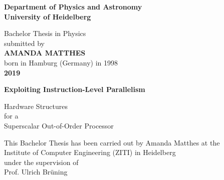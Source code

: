 \documentclass[12pt,a4paper]{article} %
\begin{document}
\thispagestyle{empty}
\begin{titlepage}
	\begin{center}
		
		\Large\textbf{Department of Physics and Astronomy\\
			University of Heidelberg}
		
		\vspace{17cm}
		
		\normalsize
		Bachelor Thesis in Physics\\
		submitted by\\
		\vspace{0.5cm}
		\Large\textbf{AMANDA MATTHES}\\
		\normalsize
		\vspace{0.5cm}
		born in Hamburg (Germany) in 1998\\
		\vspace{0.5cm}
		\Large\textbf{2019}
		\normalsize
		
		\newpage
		\thispagestyle{empty}
		
		
		
		
		{\fontsize{21}{30}\selectfont 
			\textbf{Exploiting Instruction-Level Parallelism}
			\par
		}
		\vspace{.5cm}
		{\fontsize{22}{23}\selectfont 
			Hardware Structures\\
			for a \\
			Superscalar Out-of-Order Processor
			\par
		}
		
		\vspace{16cm}
		
		\normalsize
		This Bachelor Thesis has been carried out by Amanda Matthes at the\\
		Institute of Computer Engineering (ZITI) in Heidelberg\\
		under the supervision of\\
		Prof. Ulrich Brüning
		
		\vfill
	\end{center}
	
\end{titlepage}
\newpage 

\end{document}
